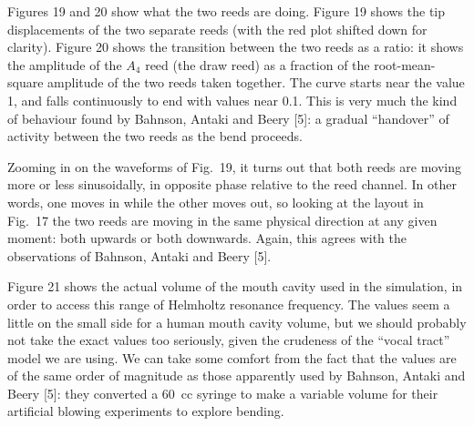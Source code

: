 
  Figures 19 and 20 show what the two reeds are doing. Figure 19 shows the tip 
  displacements of the two separate reeds (with the red plot shifted down for 
  clarity). Figure 20 shows the transition between the two reeds as a ratio: it 
  shows the amplitude of the $A_4$ reed (the draw reed) as a fraction of the 
  root-mean-square amplitude of the two reeds taken together. The curve starts 
  near the value 1, and falls continuously to end with values near 0.1. This is 
  very much the kind of behaviour found by Bahnson, Antaki and Beery [5]: a 
  gradual “handover” of activity between the two reeds as the bend proceeds. 



  Zooming in on the waveforms of Fig.\ 19, it turns out that both reeds are 
  moving more or less sinusoidally, in opposite phase relative to the reed 
  channel. In other words, one moves in while the other moves out, so looking 
  at the layout in Fig.\ 17 the two reeds are moving in the same physical 
  direction at any given moment: both upwards or both downwards. Again, this 
  agrees with the observations of Bahnson, Antaki and Beery [5]. 

  Figure 21 shows the actual volume of the mouth cavity used in the simulation, 
  in order to access this range of Helmholtz resonance frequency. The values 
  seem a little on the small side for a human mouth cavity volume, but we 
  should probably not take the exact values too seriously, given the crudeness 
  of the “vocal tract” model we are using. We can take some comfort from the 
  fact that the values are of the same order of magnitude as those apparently 
  used by Bahnson, Antaki and Beery [5]: they converted a 60~cc syringe to make 
  a variable volume for their artificial blowing experiments to explore 
  bending. 

